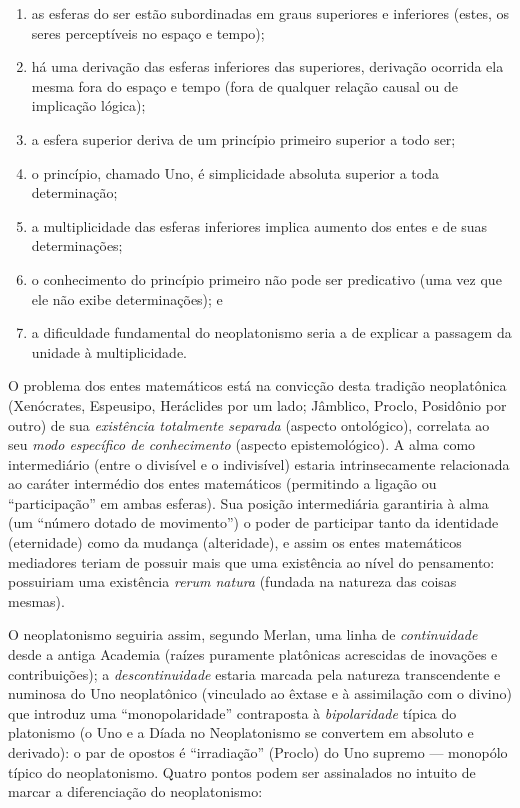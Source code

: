 {\begin{enumerate}
\item as esferas do ser estão subordinadas em graus superiores e
inferiores (estes, os seres perceptíveis no espaço e tempo); 

\item há uma derivação das esferas inferiores das superiores,
derivação ocorrida ela mesma fora do espaço e tempo (fora de
qualquer relação causal ou de implicação lógica); 

\item a esfera superior deriva de um princípio primeiro superior a
todo ser; 

\item o princípio, chamado Uno, é simplicidade absoluta superior a
toda determinação; 

\item a multiplicidade das esferas inferiores implica aumento dos
entes e de suas determinações; 

\item o conhecimento do princípio primeiro não pode ser predicativo
(uma vez que ele não exibe determinações); e 

\item a dificuldade fundamental do neoplatonismo seria a de explicar
a passagem da unidade à multiplicidade.
\end{enumerate}

O problema dos entes matemáticos está na convicção desta
tradição neoplatônica (Xenócrates, Espeusipo, Heráclides por um
lado; Jâmblico, Proclo, Posidônio por outro) de sua
\emph{existência totalmente separada} (aspecto ontológico),
correlata ao seu \emph{modo específico de conhecimento}
(aspecto epistemológico). A alma como intermediário (entre o
divisível e o indivisível) estaria intrinsecamente relacionada
ao caráter intermédio dos entes matemáticos (permitindo a
ligação ou ``participação'' em
ambas esferas). Sua posição intermediária garantiria à alma (um
“número dotado de movimento”) o poder de participar tanto da
identidade (eternidade) como da mudança (alteridade), e assim os
entes matemáticos mediadores teriam de possuir mais que uma
existência ao nível do pensamento: possuiriam uma existência
\emph{rerum natura} (fundada na natureza das coisas mesmas).

O neoplatonismo seguiria assim, segundo Merlan, uma linha de
\emph{continuidade} desde a antiga Academia (raízes puramente
platônicas acrescidas de inovações e contribuições); a
\emph{descontinuidade} estaria marcada pela natureza
transcendente e numinosa do Uno neoplatônico (vinculado ao
êxtase e à assimilação com o divino) que introduz uma
“monopolaridade” contraposta à \emph{bipolaridade} típica do
platonismo (o Uno e a Díada no Neoplatonismo se convertem em
absoluto e derivado): o par de opostos é
``irradiação'' (Proclo) do Uno
supremo --- monopólo típico do neoplatonismo. Quatro pontos podem
ser assinalados no intuito de marcar a diferenciação do
neoplatonismo:

}
